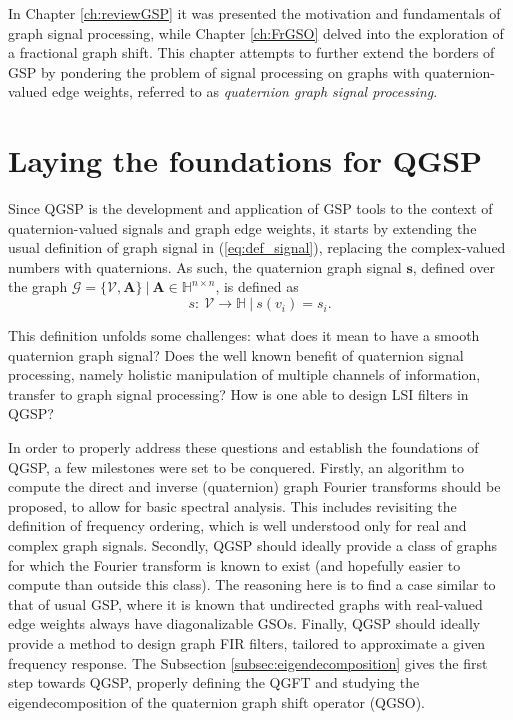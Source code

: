 In Chapter \ref{ch:reviewGSP} it was presented the motivation and fundamentals of graph signal processing, while Chapter \ref{ch:FrGSO} delved into the exploration of a fractional graph shift.
This chapter attempts to further extend the borders of GSP by pondering the problem of signal processing on graphs with quaternion-valued edge weights, referred to as \textit{quaternion graph signal processing}.

\section{Laying the foundations for QGSP}

Since QGSP is the development and application of GSP tools to the context of quaternion-valued signals and graph edge weights, it starts by extending the usual definition of graph signal in (\ref{eq:def_signal}), replacing the complex-valued numbers with quaternions. As such, the quaternion graph signal $\mathbf{s}$, defined over the graph $\mathcal{G} = \{\mathcal{V}, \mathbf{A}\}  \ | \ \mathbf{A} \in \mathbb{H}^{n \times n}$, is defined as
\begin{equation}\label{eq:qgsp_defs}
    s: \ \mathcal{V} \rightarrow \mathbb{H} \ | \ s(v_i) = s_i.
\end{equation}

This definition unfolds some challenges: what does it
mean to have a smooth quaternion graph signal? Does the well known benefit of quaternion signal processing, namely holistic manipulation of multiple channels of information, transfer to graph signal processing? How is one able to design LSI filters in QGSP?

In order to properly address these questions and establish the foundations of QGSP, a few milestones were set to be conquered. Firstly, an algorithm to compute the direct and inverse (quaternion) graph Fourier transforms should be proposed, to allow for basic spectral analysis. This includes revisiting the definition of frequency ordering, which is well understood only for real and complex graph signals. Secondly, QGSP should ideally provide a class of graphs for which the Fourier transform is known to exist (and hopefully easier to compute than outside this class). The reasoning here is to find a case similar to that of usual GSP, where it is known that undirected graphs with real-valued edge weights always have diagonalizable GSOs. Finally, QGSP should ideally provide a method to design graph FIR filters, tailored to approximate a given frequency response. The Subsection \ref{subsec:eigendecomposition} gives the first step towards QGSP, properly defining the QGFT and studying the eigendecomposition of the quaternion graph shift operator (QGSO).

